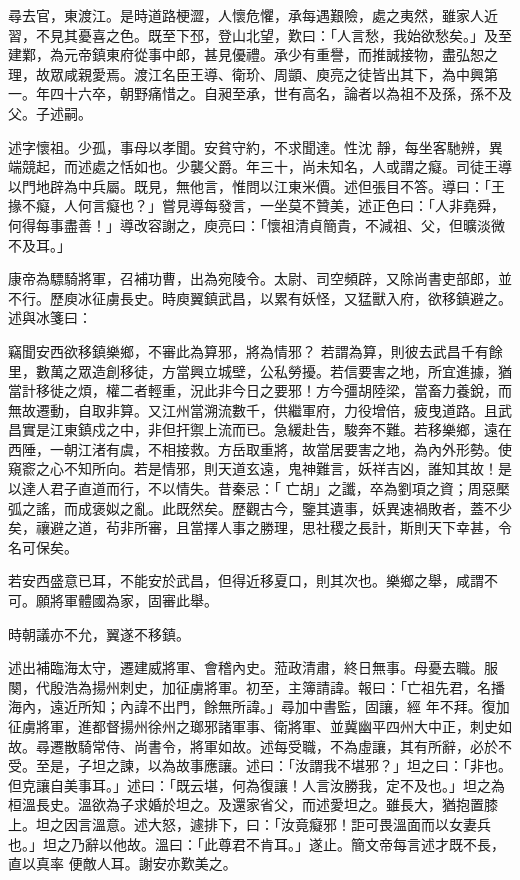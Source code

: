 \begin{pinyinscope}
 尋去官，東渡江。是時道路梗澀，人懷危懼，承每遇艱險，處之夷然，雖家人近習，不見其憂喜之色。既至下邳，登山北望，歎曰：「人言愁，我始欲愁矣。」及至建鄴，為元帝鎮東府從事中郎，甚見優禮。承少有重譽，而推誠接物，盡弘恕之理，故眾咸親愛焉。渡江名臣王導、衛玠、周顗、庾亮之徒皆出其下，為中興第一。年四十六卒，朝野痛惜之。自昶至承，世有高名，論者以為祖不及孫，孫不及父。子述嗣。



 述字懷祖。少孤，事母以孝聞。安貧守約，不求聞達。性沈
 靜，每坐客馳辨，異端競起，而述處之恬如也。少襲父爵。年三十，尚未知名，人或謂之癡。司徒王導以門地辟為中兵屬。既見，無他言，惟問以江東米價。述但張目不答。導曰：「王掾不癡，人何言癡也？」嘗見導每發言，一坐莫不贊美，述正色曰：「人非堯舜，何得每事盡善！」導改容謝之，庾亮曰：「懷祖清貞簡貴，不減祖、父，但曠淡微不及耳。」



 康帝為驃騎將軍，召補功曹，出為宛陵令。太尉、司空頻辟，又除尚書吏部郎，並不行。歷庾冰征虜長史。時庾翼鎮武昌，以累有妖怪，又猛獸入府，欲移鎮避之。述與冰箋曰：



 竊聞安西欲移鎮樂鄉，不審此為算邪，將為情邪？
 若謂為算，則彼去武昌千有餘里，數萬之眾造創移徒，方當興立城壁，公私勞擾。若信要害之地，所宜進據，猶當計移徙之煩，權二者輕重，況此非今日之要邪！方今彊胡陸梁，當畜力養銳，而無故遷動，自取非算。又江州當溯流數千，供繼軍府，力役增倍，疲曳道路。且武昌實是江東鎮戍之中，非但扞禦上流而已。急緩赴告，駿奔不難。若移樂鄉，遠在西陲，一朝江渚有虞，不相接救。方岳取重將，故當居要害之地，為內外形勢。使窺窬之心不知所向。若是情邪，則天道玄遠，鬼神難言，妖祥吉凶，誰知其故！是以達人君子直道而行，不以情失。昔秦忌：「
 亡胡」之讖，卒為劉項之資；周惡檿弧之謠，而成褒姒之亂。此既然矣。歷觀古今，鑒其遺事，妖異速禍敗者，蓋不少矣，禳避之道，茍非所審，且當擇人事之勝理，思社稷之長計，斯則天下幸甚，令名可保矣。



 若安西盛意已耳，不能安於武昌，但得近移夏口，則其次也。樂鄉之舉，咸謂不可。願將軍體國為家，固審此舉。



 時朝議亦不允，翼遂不移鎮。



 述出補臨海太守，遷建威將軍、會稽內史。蒞政清肅，終日無事。母憂去職。服闋，代殷浩為揚州刺史，加征虜將軍。初至，主簿請諱。報曰：「亡祖先君，名播海內，遠近所知；內諱不出門，餘無所諱。」尋加中書監，固讓，經
 年不拜。復加征虜將軍，進都督揚州徐州之瑯邪諸軍事、衛將軍、並冀幽平四州大中正，刺史如故。尋遷散騎常侍、尚書令，將軍如故。述每受職，不為虛讓，其有所辭，必於不受。至是，子坦之諫，以為故事應讓。述曰：「汝謂我不堪邪？」坦之曰：「非也。但克讓自美事耳。」述曰：「既云堪，何為復讓！人言汝勝我，定不及也。」坦之為桓溫長史。溫欲為子求婚於坦之。及還家省父，而述愛坦之。雖長大，猶抱置膝上。坦之因言溫意。述大怒，遽排下，曰：「汝竟癡邪！詎可畏溫面而以女妻兵也。」坦之乃辭以他故。溫曰：「此尊君不肯耳。」遂止。簡文帝每言述才既不長，直以真率
 便敵人耳。謝安亦歎美之。




\end{pinyinscope}
